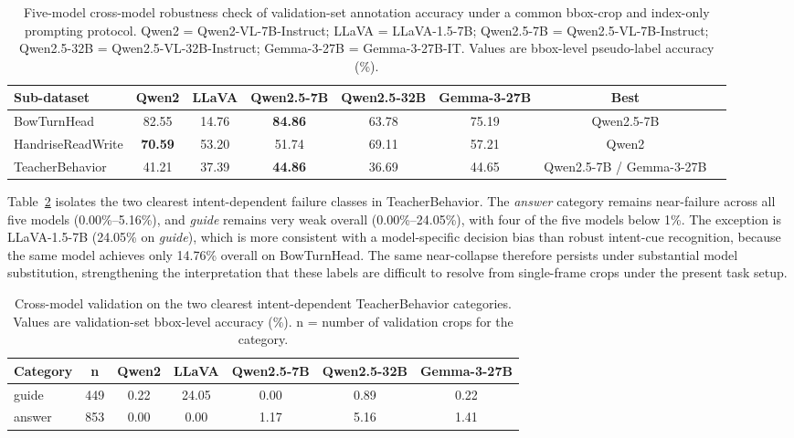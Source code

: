 \documentclass[10pt,letterpaper]{article}
\begin{document}
\begin{table}[H]
\caption{Five-model cross-model robustness check of validation-set annotation accuracy
under a common bbox-crop and index-only prompting protocol.
Qwen2 = Qwen2-VL-7B-Instruct;
LLaVA = LLaVA-1.5-7B;
Qwen2.5-7B = Qwen2.5-VL-7B-Instruct;
Qwen2.5-32B = Qwen2.5-VL-32B-Instruct;
Gemma-3-27B = Gemma-3-27B-IT.
Values are bbox-level pseudo-label accuracy (\%).}
\label{tab:crossmodel_overall}
\centering
\scriptsize
\begin{tabular}{lccccccl}
\toprule
\textbf{Sub-dataset} & \textbf{Qwen2} & \textbf{LLaVA} & \textbf{Qwen2.5-7B} & \textbf{Qwen2.5-32B} & \textbf{Gemma-3-27B} & \textbf{Best} \\
\midrule
BowTurnHead       & 82.55 & 14.76 & \textbf{84.86} & 63.78 & 75.19 & Qwen2.5-7B \\
HandriseReadWrite & \textbf{70.59} & 53.20 & 51.74 & 69.11 & 57.21 & Qwen2 \\
TeacherBehavior   & 41.21 & 37.39 & \textbf{44.86} & 36.69 & 44.65 & Qwen2.5-7B / Gemma-3-27B \\
\bottomrule
\end{tabular}
\normalsize
\end{table}

Table~\ref{tab:crossmodel_intent} isolates the two clearest
intent-dependent failure classes in TeacherBehavior.
The \textit{answer} category remains near-failure across all five
models (0.00\%--5.16\%), and \textit{guide} remains very weak overall
(0.00\%--24.05\%), with four of the five models below 1\%.
The exception is LLaVA-1.5-7B (24.05\% on \textit{guide}), which is
more consistent with a model-specific decision bias than robust
intent-cue recognition, because the same model achieves only 14.76\%
overall on BowTurnHead.
The same near-collapse therefore persists under substantial model
substitution, strengthening the interpretation that these labels are
difficult to resolve from single-frame crops under the present task
setup.

\begin{table}[H]
\caption{Cross-model validation on the two clearest intent-dependent
TeacherBehavior categories.
Values are validation-set bbox-level accuracy (\%).
n = number of validation crops for the category.}
\label{tab:crossmodel_intent}
\centering
\begin{tabular}{lcccccc}
\toprule
\textbf{Category} & \textbf{n} & \textbf{Qwen2} & \textbf{LLaVA} & \textbf{Qwen2.5-7B} & \textbf{Qwen2.5-32B} & \textbf{Gemma-3-27B} \\
\midrule
guide  & 449 & 0.22 & 24.05 & 0.00 & 0.89 & 0.22 \\
answer & 853 & 0.00 & 0.00 & 1.17 & 5.16 & 1.41 \\
\bottomrule
\end{tabular}
\end{table}
\end{document}
